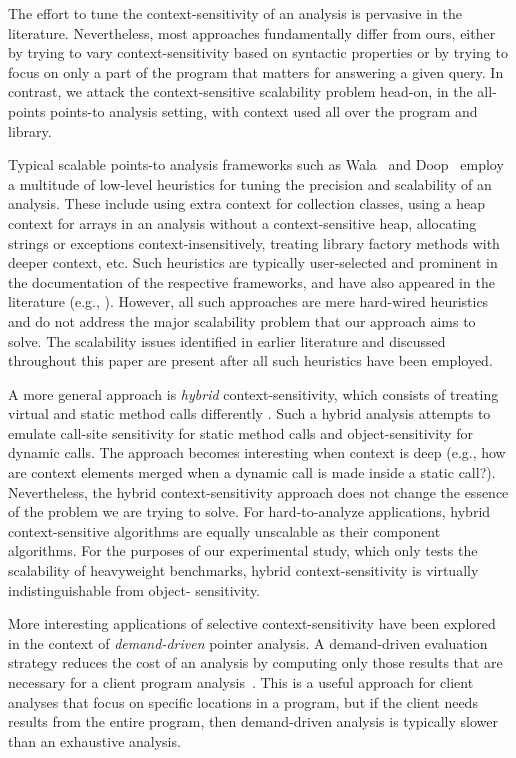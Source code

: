 The effort to tune the context-sensitivity of an analysis is pervasive
in the literature. Nevertheless, most approaches fundamentally differ
from ours, either by trying to vary context-sensitivity based on
syntactic properties or by trying to focus on only a part of the program
that matters for answering a given query.
In contrast, we attack the context-sensitive scalability problem 
head-on, in the all-points points-to analysis setting, with context
used all over the program and library.

Typical scalable points-to analysis frameworks such as
Wala~\cite{www:wala} and Doop~\cite{BS-OOPSLA09} employ a multitude of
low-level heuristics for tuning the precision and scalability of an
analysis. These include using extra context for collection classes,
using a heap context for arrays in an analysis without a
context-sensitive heap, allocating strings or exceptions
context-insensitively, treating library factory methods with deeper
context, etc. Such heuristics are typically user-selected and
prominent in the documentation of the respective frameworks, and have
also appeared in the literature (e.g.,
\cite{Tripp:2009:TET:1542476.1542486,exceptions-cc13}).  However, all
such approaches are mere hard-wired heuristics and do not address the
major scalability problem that our approach aims to solve. The
scalability issues identified in earlier literature and discussed
throughout this paper are present after all such heuristics have been
employed.

A more general approach is \emph{hybrid} context-sensitivity, which
consists of treating virtual and static method calls differently
\cite{hybrid-pldi13}. Such a hybrid analysis attempts to emulate
call-site sensitivity for static method calls and object-sensitivity
for dynamic calls. The approach becomes interesting when context is
deep (e.g., how are context elements merged when a dynamic call is
made inside a static call?). Nevertheless, the hybrid
context-sensitivity approach does not change the essence of the
problem we are trying to solve. For hard-to-analyze applications,
hybrid context-sensitive algorithms are equally unscalable as their
component algorithms. For the purposes of our experimental study,
which only tests the scalability of heavyweight benchmarks, hybrid
context-sensitivity is virtually indistinguishable from object-
sensitivity.

More interesting applications of selective context-sensitivity have
been explored in the context of \emph{demand-driven} pointer analysis.
A demand-driven evaluation strategy reduces the cost of an analysis by
computing only those results that are necessary for a client program
analysis~\cite{1094817,1134027,1328464,378802}. This is a useful
approach for client analyses that focus on specific locations in a
program, but if the client needs results from the entire program, then
demand-driven analysis is typically slower than an exhaustive
analysis.

